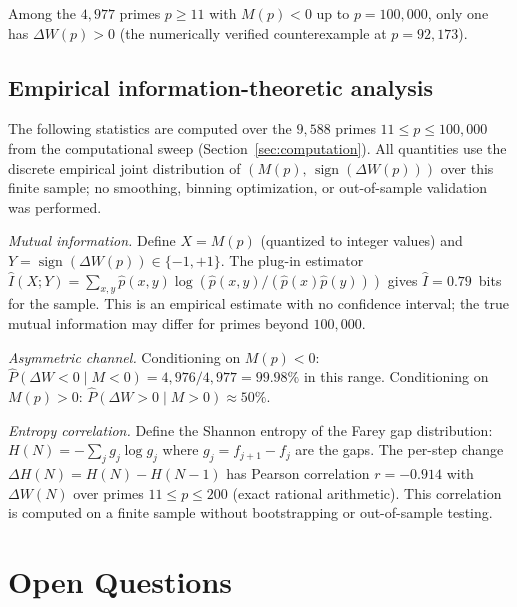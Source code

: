 \documentclass[11pt]{article}
\theoremstyle{definition}
\begin{document}
\noindent Among the $4{,}977$ primes $p \ge 11$ with $M(p) < 0$
up to $p = 100{,}000$, only one has $\Delta W(p) > 0$ (the
numerically verified counterexample at $p = 92{,}173$).

\subsection{Empirical information-theoretic analysis}

The following statistics are computed over the $9{,}588$ primes
$11 \le p \le 100{,}000$ from the computational sweep
(Section~\ref{sec:computation}).  All quantities use the
discrete empirical joint distribution of $(M(p),\,
\operatorname{sign}(\Delta W(p)))$ over this finite sample;
no smoothing, binning optimization, or out-of-sample validation
was performed.

\emph{Mutual information.}
Define $X = M(p)$ (quantized to integer values) and
$Y = \operatorname{sign}(\Delta W(p)) \in \{-1, +1\}$.
The plug-in estimator
$\hat{I}(X;Y) = \sum_{x,y} \hat{p}(x,y)
\log(\hat{p}(x,y)/(\hat{p}(x)\hat{p}(y)))$
gives $\hat{I} = 0.79$~bits for the sample.
This is an empirical estimate with no confidence interval;
the true mutual information may differ for primes beyond
$100{,}000$.

\emph{Asymmetric channel.}
Conditioning on $M(p) < 0$: $\hat{P}(\Delta W < 0 \mid M < 0)
= 4{,}976/4{,}977 = 99.98\%$ in this range.
Conditioning on $M(p) > 0$: $\hat{P}(\Delta W > 0 \mid M > 0)
\approx 50\%$.

\emph{Entropy correlation.}
Define the Shannon entropy of the Farey gap distribution:
$H(N) = -\sum_{j} g_j \log g_j$ where $g_j = f_{j+1} - f_j$
are the gaps.  The per-step change $\Delta H(N) = H(N) - H(N-1)$
has Pearson correlation $r = -0.914$ with $\Delta W(N)$ over
primes $11 \le p \le 200$ (exact rational arithmetic).
This correlation is computed on a finite sample without
bootstrapping or out-of-sample testing.


\section{Open Questions}\label{sec:open}
\end{document}
